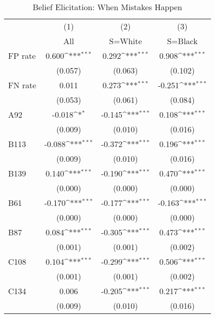 \begin{table}[htbp]\centering
\def\sym#1{\ifmmode^{#1}\else\(^{#1}\)\fi}
\caption{Belief Elicitation: When Mistakes Happen}
\begin{tabular}{l*{3}{c}}
\hline\hline
                &\multicolumn{1}{c}{(1)}&\multicolumn{1}{c}{(2)}&\multicolumn{1}{c}{(3)}\\
                &\multicolumn{1}{c}{All}&\multicolumn{1}{c}{S=White}&\multicolumn{1}{c}{S=Black}\\
\hline
FP rate         &    0.600\sym{***}&    0.292\sym{***}&    0.908\sym{***}\\
                &  (0.057)         &  (0.063)         &  (0.102)         \\
FN rate         &    0.011         &    0.273\sym{***}&   -0.251\sym{***}\\
                &  (0.053)         &  (0.061)         &  (0.084)         \\
A92             &   -0.018\sym{*}  &   -0.145\sym{***}&    0.108\sym{***}\\
                &  (0.009)         &  (0.010)         &  (0.016)         \\
B113            &   -0.088\sym{***}&   -0.372\sym{***}&    0.196\sym{***}\\
                &  (0.009)         &  (0.010)         &  (0.016)         \\
B139            &    0.140\sym{***}&   -0.190\sym{***}&    0.470\sym{***}\\
                &  (0.000)         &  (0.000)         &  (0.000)         \\
B61             &   -0.170\sym{***}&   -0.177\sym{***}&   -0.163\sym{***}\\
                &  (0.000)         &  (0.000)         &  (0.000)         \\
B87             &    0.084\sym{***}&   -0.305\sym{***}&    0.473\sym{***}\\
                &  (0.001)         &  (0.001)         &  (0.002)         \\
C108            &    0.104\sym{***}&   -0.299\sym{***}&    0.506\sym{***}\\
                &  (0.001)         &  (0.001)         &  (0.002)         \\
C134            &    0.006         &   -0.205\sym{***}&    0.217\sym{***}\\
                &  (0.009)         &  (0.010)         &  (0.016)         \\

\end{tabular}
\end{table}
